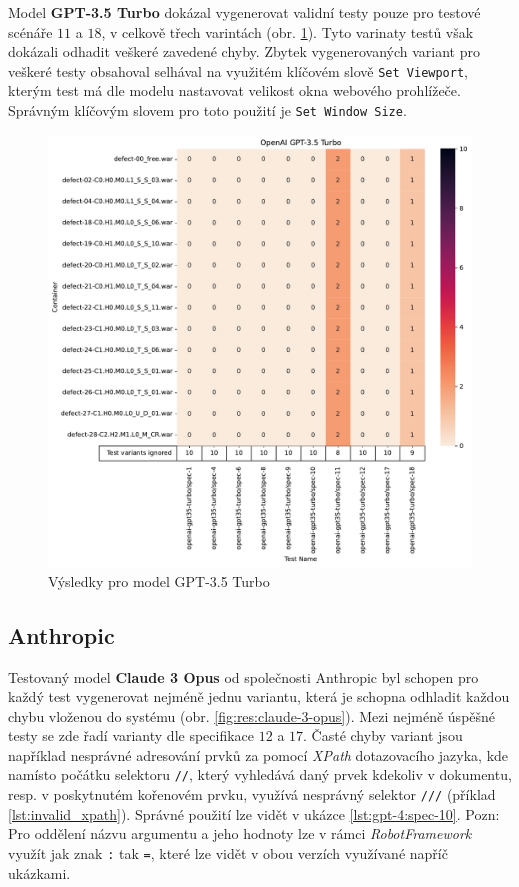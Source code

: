 \documentclass[czech, ma, kiv, he, iso690numb, pdf, viewonly]{fasthesis}
\begin{document}
            Model \textbf{GPT-3.5 Turbo} dokázal vygenerovat validní testy pouze pro testové scénáře \(11\) a \(18\), v celkově třech varintách (obr. \ref{fig:res:gpt-35-turbo}). Tyto varinaty testů však dokázali odhadit veškeré zavedené chyby. Zbytek vygenerovaných variant pro veškeré testy obsahoval selhával na využitém klíčovém slově \verb|Set Viewport|, kterým test má dle modelu nastavovat velikost okna webového prohlížeče. Správným klíčovým slovem pro toto použití je \verb|Set Window Size|.

            \begin{figure}
                \includegraphics[width=\textwidth]{pic/gpt-3.5-turbo-results.pdf}
                \caption{Výsledky pro model GPT-3.5 Turbo}
                \label{fig:res:gpt-35-turbo}
            \end{figure}

        \subsection{Anthropic} \label{sec:res:anthropic}

            Testovaný model \textbf{Claude 3 Opus} od společnosti Anthropic byl schopen pro každý test vygenerovat nejméně jednu variantu, která je schopna odhladit každou chybu vloženou do systému (obr. \ref{fig:res:claude-3-opus}). Mezi nejméně úspěšné testy se zde řadí varianty dle specifikace \(12\) a \(17\). Časté chyby variant jsou například nesprávné adresování prvků za pomocí \textit{XPath} dotazovacího jazyka, kde namísto počátku selektoru \verb|//|, který vyhledává daný prvek kdekoliv v dokumentu, resp. v poskytnutém kořenovém prvku, využívá nesprávný selektor \verb|///| (příklad \ref{lst:invalid_xpath}). Správné použití lze vidět v ukázce \ref{lst:gpt-4:spec-10}. Pozn: Pro oddělení názvu argumentu a jeho hodnoty lze v rámci \textit{RobotFramework} využít jak znak \verb|:| tak \verb|=|, které lze vidět v obou verzích využívané napříč ukázkami.
\end{document}
